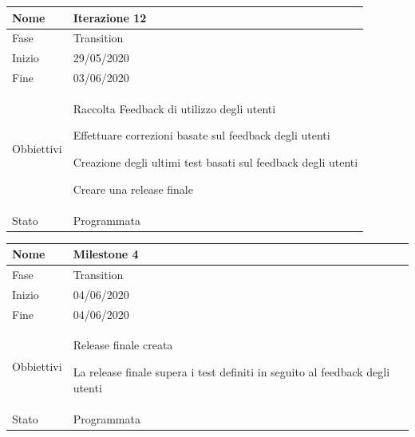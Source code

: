 \begin{center}
\begin{tabular}{ |p{2cm}|p{10cm}|  }
\hline
Nome & Iterazione 12 \\\hline
Fase & Transition \\\hline
Inizio & 29/05/2020 \\\hline
Fine &  03/06/2020  \\\hline
Obbiettivi & 
	\begin{compactitem}
		\item Raccolta Feedback di utilizzo degli utenti
		\item Effettuare correzioni basate sul feedback degli utenti
		\item Creazione degli ultimi test basati sul feedback degli utenti
		\item Creare una release finale
	\end{compactitem}\\\hline
Stato &  Programmata \\\hline
\end{tabular}
\label{table:12}\newline

\begin{tabular}{ |p{2cm}|p{10cm}|  }
\hline
Nome & Milestone 4\\\hline
Fase & Transition \\\hline
Inizio & 04/06/2020 \\\hline
Fine &  04/06/2020 \\\hline
Obbiettivi & 
	\begin{compactitem}
		\item Release finale creata
		\item La release finale supera i test definiti in seguito al feedback degli utenti
	\end{compactitem}\\\hline
Stato &  Programmata \\\hline
\end{tabular}
\label{table:milestone4}\newline


\end{center}

